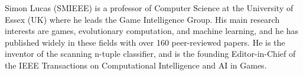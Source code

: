 \documentclass[journal]{IEEEtran}
\begin{document}
\begin{biography}{Simon Lucas}
(SMIEEE) is a professor of Computer Science at the University of Essex (UK) where he leads the Game Intelligence Group. His main research interests are games, evolutionary computation, and machine learning, and he has published widely in these fields with over 160 peer-reviewed papers. He is the inventor of the scanning n-tuple classifier, and is the founding Editor-in-Chief of the IEEE Transactions on Computational Intelligence and AI in Games.
\end{biography}






\end{document}
